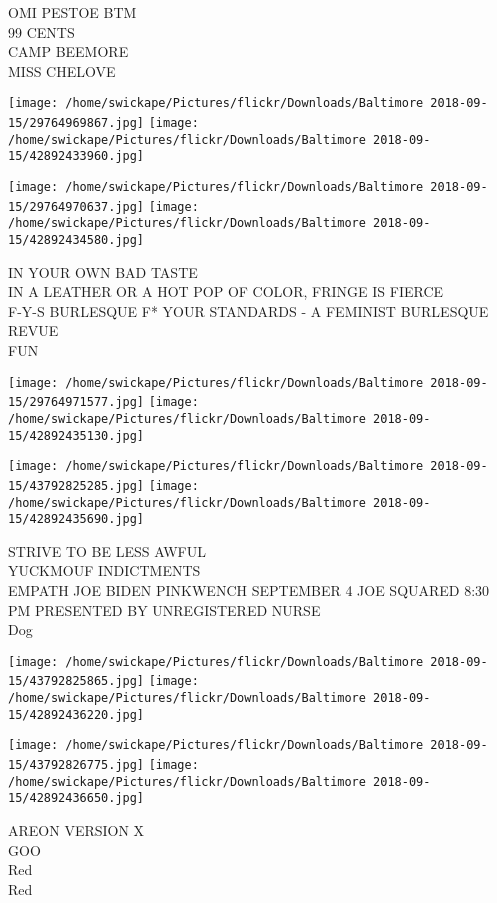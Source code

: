 \documentclass[10pt,letterpaper]{article}
\begin{document}
OMI PESTOE BTM\\
99 CENTS\\
CAMP BEEMORE\\
MISS CHELOVE
\pagebreak

\texttt{[image: /home/swickape/Pictures/flickr/Downloads/Baltimore 2018-09-15/29764969867.jpg]}
\texttt{[image: /home/swickape/Pictures/flickr/Downloads/Baltimore 2018-09-15/42892433960.jpg]}

\texttt{[image: /home/swickape/Pictures/flickr/Downloads/Baltimore 2018-09-15/29764970637.jpg]}
\texttt{[image: /home/swickape/Pictures/flickr/Downloads/Baltimore 2018-09-15/42892434580.jpg]}

IN YOUR OWN BAD TASTE\\
IN A LEATHER OR A HOT POP OF COLOR, FRINGE IS FIERCE\\
F{-}Y{-}S BURLESQUE F* YOUR STANDARDS {-} A FEMINIST BURLESQUE REVUE\\
FUN
\pagebreak

\texttt{[image: /home/swickape/Pictures/flickr/Downloads/Baltimore 2018-09-15/29764971577.jpg]}
\texttt{[image: /home/swickape/Pictures/flickr/Downloads/Baltimore 2018-09-15/42892435130.jpg]}

\texttt{[image: /home/swickape/Pictures/flickr/Downloads/Baltimore 2018-09-15/43792825285.jpg]}
\texttt{[image: /home/swickape/Pictures/flickr/Downloads/Baltimore 2018-09-15/42892435690.jpg]}

STRIVE TO BE LESS AWFUL\\
YUCKMOUF INDICTMENTS\\
EMPATH JOE BIDEN PINKWENCH SEPTEMBER 4 JOE SQUARED 8:30 PM PRESENTED BY UNREGISTERED NURSE\\
Dog
\pagebreak

\texttt{[image: /home/swickape/Pictures/flickr/Downloads/Baltimore 2018-09-15/43792825865.jpg]}
\texttt{[image: /home/swickape/Pictures/flickr/Downloads/Baltimore 2018-09-15/42892436220.jpg]}

\texttt{[image: /home/swickape/Pictures/flickr/Downloads/Baltimore 2018-09-15/43792826775.jpg]}
\texttt{[image: /home/swickape/Pictures/flickr/Downloads/Baltimore 2018-09-15/42892436650.jpg]}

AREON VERSION X\\
GOO\\
Red\\
Red
\pagebreak
\end{document}
